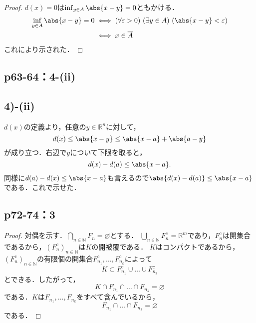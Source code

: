 \documentclass[a4paper,10pt,fleqn]{ltjsarticle}
\begin{document}
\begin{tleftbar}
    \begin{proof}
            $d(x)=0$は$\inf_{y \in A} \abs{x-y} =0$ともかける．
            \begin{align*}
                \inf_{y \in A} \abs{x-y} =0 & \iff (\forall \varepsilon>0) \ (\exists y \in A)\ ( \abs{x-y}<\varepsilon ) \\
                & \iff x \in \overline{A}
            \end{align*}
            これにより示された．
        \end{proof}
    \end{tleftbar}


 \subsection*{p63-64：4-(ii)}
    

\subsection*{4)-(ii)}
  \begin{leftbar}
    $d(x)$の定義より，任意の$y \in \mathbb{R} ^n$に対して，
    \[
      d(x) \leq \abs{x-y} \leq \abs{x-a} + \abs{a-y}
    \]
    が成り立つ．右辺で$y$について下限を取ると，
    \[
      d(x) - d(a) \leq \abs{x-a}.
    \]
    同様に$d(a) - d(x) \leq \abs{x-a}$も言えるので$\abs{d(x) - d(a)} \leq \abs{x-a}$である．これで示せた．
  \end{leftbar}

    \newpage 

    \subsection*{p72-74：3}

    \begin{leftbar}
        \begin{proof}
          対偶を示す．$\bigcap_{n \in \mathbb{N}}F_n = \varnothing$とする．
          $\bigcup_{n \in \mathbb{N}}F_n^c = \mathbb{R}^m$であり，$F_n^c$は開集合であるから，$(F_n^c)_{n \in \mathbb{N}}$は$K$の開被覆である．
          $K$はコンパクトであるから，$(F_n^c)_{n \in \mathbb{N}}$の有限個の開集合$F_{n_1}^c,\ldots,F_{n_k}^c$によって
          \[
            K \subset F_{n_1}^c \cup \ldots \cup F_{n_k}^c
          \]
          とできる．したがって，
          \[
            K \cap F_{n_1} \cap \ldots \cap F_{n_k} = \varnothing
          \]
          である．$K$は$F_{n_1},\ldots,F_{n_k}$をすべて含んでいるから，
          \[
            F_{n_1} \cap \ldots \cap F_{n_k} = \varnothing
          \]
          である．
        \end{proof}
      \end{leftbar}
\end{document}
